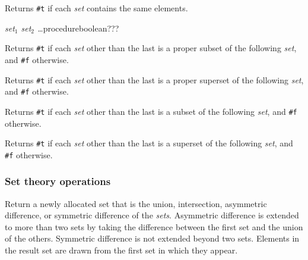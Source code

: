 \begin{entry}{%
  }

  Returns \texttt{\#t} if each \emph{set} contains the same elements.
\end{entry}

\begin{entry}{%
  \emph{set$_1$ set$_2$ \ldots}{procedure}{boolean???}}

Returns \texttt{\#t} if each \emph{set} other than the last is a
proper subset of the following \emph{set}, and \texttt{\#f} otherwise.
\end{entry}

\begin{entry}{%
  }

  Returns \texttt{\#t} if each \emph{set} other than the last is a
  proper superset of the following \emph{set}, and \texttt{\#f}
  otherwise.
\end{entry}

\begin{entry}{%
  }

  Returns \texttt{\#t} if each \emph{set} other than the last is a
  subset of the following \emph{set}, and \texttt{\#f} otherwise.
\end{entry}

\begin{entry}{%
  }

  Returns \texttt{\#t} if each \emph{set} other than the last is a
  superset of the following \emph{set}, and \texttt{\#f} otherwise.
\end{entry}

\subsubsection{Set theory operations}

\begin{entry}{%
  }

  Return a newly allocated set that is the union, intersection,
  asymmetric difference, or symmetric difference of the
  \emph{sets}. Asymmetric difference is extended to more than two sets
  by taking the difference between the first set and the union of the
  others. Symmetric difference is not extended beyond two
  sets. Elements in the result set are drawn from the first set in
  which they appear.
\end{entry}

